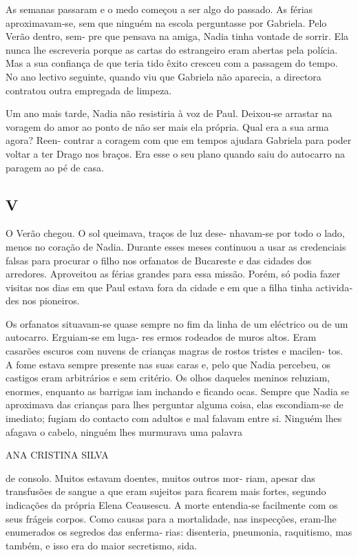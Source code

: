 As semanas passaram e o medo começou a ser algo do passado. As férias
aproximavam‑se, sem que ninguém na escola perguntasse por Gabriela. Pelo
Verão dentro, sem‑ pre que pensava na amiga, Nadia tinha vontade de
sorrir. Ela nunca lhe escreveria porque as cartas do estrangeiro eram
abertas pela polícia. Mas a sua confiança de que teria tido êxito
cresceu com a passagem do tempo. No ano lectivo seguinte, quando viu que
Gabriela não aparecia, a directora contratou outra empregada de limpeza.

Um ano mais tarde, Nadia não resistiria à voz de Paul. Deixou‑se
arrastar na voragem do amor ao ponto de não ser mais ela própria. Qual
era a sua arma agora? Reen‑ contrar a coragem com que em tempos ajudara
Gabriela para poder voltar a ter Drago nos braços. Era esse o seu plano
quando saiu do autocarro na paragem ao pé de casa.


\subsection{V}

O Verão chegou. O sol queimava, traços de luz dese‑ nhavam‑se por todo o
lado, menos no coração de Nadia. Durante esses meses continuou a usar as
credenciais falsas para procurar o filho nos orfanatos de Bucareste e
das cidades dos arredores. Aproveitou as férias grandes para essa
missão. Porém, só podia fazer visitas nos dias em que Paul estava fora
da cidade e em que a filha tinha activida‑ des nos pioneiros.

Os orfanatos situavam‑se quase sempre no fim da linha de um eléctrico ou
de um autocarro. Erguiam‑se em luga‑ res ermos rodeados de muros altos.
Eram casarões escuros com nuvens de crianças magras de rostos tristes e
macilen‑ tos. A fome estava sempre presente nas suas caras e, pelo que
Nadia percebeu, os castigos eram arbitrários e sem critério. Os olhos
daqueles meninos reluziam, enormes, enquanto as barrigas iam inchando e
ficando ocas. Sempre que Nadia se aproximava das crianças para lhes
perguntar alguma coisa, elas escondiam‑se de imediato; fugiam do
contacto com adultos e mal falavam entre si. Ninguém lhes afagava o
cabelo, ninguém lhes murmurava uma palavra

ANA CRISTINA SILVA

de consolo. Muitos estavam doentes, muitos outros mor‑ riam, apesar das
transfusões de sangue a que eram sujeitos para ficarem mais fortes,
segundo indicações da própria Elena Ceausescu. A morte entendia‑se
facilmente com os seus frágeis corpos. Como causas para a mortalidade,
nas inspecções, eram‑lhe enumerados os segredos das enferma‑ rias:
disenteria, pneumonia, raquitismo, mas também, e isso era do maior
secretismo, sida.

